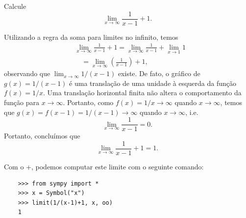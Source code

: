 \begin{exeresol}
  Calcule
  \begin{equation}
    \lim_{x\to \infty} \frac{1}{x-1}+1.
  \end{equation}
\end{exeresol}
\begin{resol}
  Utilizando a regra da soma para limites no infinito, temos
  \begin{align}
    & \lim_{x\to\infty} \frac{1}{x-1} + 1 = \lim_{x\to \infty} \frac{1}{x-1} + \lim_{x\to 1} 1 \\
    & \text{}\quad = \lim_{x\to \infty} \left(\frac{1}{x-1}\right)+1,
  \end{align}
  observando que $\lim_{x\to \infty}1/(x-1)$ existe. De fato, o gráfico de $g(x) = 1/(x-1)$ é uma translação de uma unidade à esquerda da função $f(x)=1/x$. Uma translação horizontal finita não altera o comportamento da função para $x\to \infty$. Portanto, como $f(x)=1/x\to\infty$ quando $x\to\infty$, temos que $g(x)=f(x-1)=1/(x-1)\to\infty$ quando $x\to\infty$, i.e.
  \begin{equation}
    \lim_{x\to\infty}\frac{1}{x-1} = 0.
  \end{equation}
  Portanto, concluímos que
  \begin{equation}
    \lim_{x\to \infty} \frac{1}{x-1} + 1 = 1. 
  \end{equation}

  \ifispython
  Com o {\python}+{\sympy}, podemos computar este limite com o seguinte comando:
  \begin{lstlisting}
    >>> from sympy import *
    >>> x = Symbol("x")
    >>> limit(1/(x-1)+1, x, oo)
    1
  \end{lstlisting}
  \fi
\end{resol}

